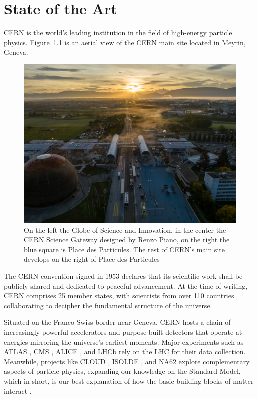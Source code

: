 \chapter{State of the Art}

\ac{CERN} \cite{cern-homepage} is the world's leading institution in the field of high-energy particle physics. Figure~\ref{fig:science-gateway} is an aerial view of the \acs{CERN} main site located in Meyrin, Geneva.

\begin{figure}[htbp]
\centering
\includegraphics[width=\textwidth]{images/introduction/cern.jpg}
\caption[CERN Science Gateway]{On the left the Globe of Science and Innovation, in the center the CERN Science Gateway designed by Renzo Piano, on the right the blue square is Place des Particules. The rest of CERN's main site develops on the right of Place des Particules \protect\cite{cern_science_gateway}}
\label{fig:science-gateway}
\end{figure}

The \acf{CERN} convention \cite{cern-convention} signed in 1953 declares that its scientific work shall be publicly shared and dedicated to peaceful advancement. At the time of writing, \ac{CERN} comprises 25 member states, with scientists from over 110 countries collaborating to decipher the fundamental structure of the universe.

Situated on the Franco-Swiss border near Geneva, \ac{CERN} hosts a chain of increasingly powerful accelerators and purpose-built detectors that operate at energies mirroring the universe's earliest moments. Major experiments such as \acs{ATLAS} \cite{atlas-experiment}, \acs{CMS} \cite{cms-experiment}, \acs{ALICE} \cite{alice-experiment}, and \acs{LHCb} \cite{lhcb-experiment} rely on the \ac{LHC} \cite{Lebrun:1284331} for their data collection. Meanwhile, projects like \acs{CLOUD} \cite{Kirkby:1310801}, \acs{ISOLDE} \cite{isolde-facility}, and NA62 \cite{Martellotti:2056863} explore complementary aspects of particle physics, expanding our knowledge on the Standard Model, which in short, is our best explanation of how the basic building blocks of matter interact \cite{standard-model}.

